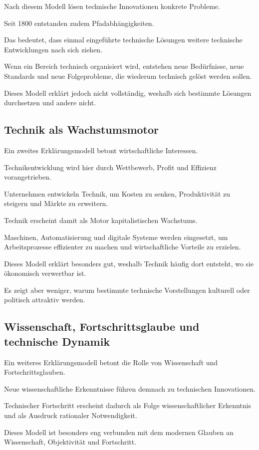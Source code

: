 Nach diesem Modell lösen technische Innovationen
konkrete Probleme.

Seit 1800 entstanden zudem Pfadabhängigkeiten.

Das bedeutet,
dass einmal eingeführte technische Lösungen
weitere technische Entwicklungen nach sich ziehen.

Wenn ein Bereich technisch organisiert wird,
entstehen neue Bedürfnisse,
neue Standards
und neue Folgeprobleme,
die wiederum technisch gelöst werden sollen.

Dieses Modell erklärt jedoch nicht vollständig,
weshalb sich bestimmte Lösungen durchsetzen
und andere nicht.

\subsection{Technik als Wachstumsmotor}

Ein zweites Erklärungsmodell betont
wirtschaftliche Interessen.

Technikentwicklung wird hier durch Wettbewerb,
Profit und Effizienz vorangetrieben.

Unternehmen entwickeln Technik,
um Kosten zu senken,
Produktivität zu steigern
und Märkte zu erweitern.

Technik erscheint damit als Motor
kapitalistischen Wachstums.

Maschinen,
Automatisierung
und digitale Systeme
werden eingesetzt,
um Arbeitsprozesse effizienter zu machen
und wirtschaftliche Vorteile zu erzielen.

Dieses Modell erklärt besonders gut,
weshalb Technik häufig dort entsteht,
wo sie ökonomisch verwertbar ist.

Es zeigt aber weniger,
warum bestimmte technische Vorstellungen
kulturell oder politisch attraktiv werden.

\subsection{Wissenschaft, Fortschrittsglaube und technische Dynamik}

Ein weiteres Erklärungsmodell betont
die Rolle von Wissenschaft und Fortschrittsglauben.

Neue wissenschaftliche Erkenntnisse
führen demnach zu technischen Innovationen.

Technischer Fortschritt erscheint dadurch
als Folge wissenschaftlicher Erkenntnis
und als Ausdruck rationaler Notwendigkeit.

Dieses Modell ist besonders eng verbunden
mit dem modernen Glauben an Wissenschaft,
Objektivität und Fortschritt.

